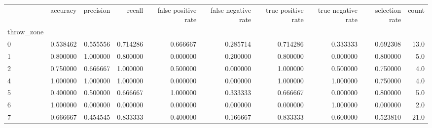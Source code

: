 \begin{tabular}{lrrrrrrrrr}
\toprule
{} &  accuracy &  precision &    recall &  false positive rate &  false negative rate &  true positive rate &  true negative rate &  selection rate &  count \\
throw\_zone &           &            &           &                      &                      &                     &                     &                 &        \\
\midrule
0          &  0.538462 &   0.555556 &  0.714286 &             0.666667 &             0.285714 &            0.714286 &            0.333333 &        0.692308 &   13.0 \\
1          &  0.800000 &   1.000000 &  0.800000 &             0.000000 &             0.200000 &            0.800000 &            0.000000 &        0.800000 &    5.0 \\
2          &  0.750000 &   0.666667 &  1.000000 &             0.500000 &             0.000000 &            1.000000 &            0.500000 &        0.750000 &    4.0 \\
4          &  1.000000 &   1.000000 &  1.000000 &             0.000000 &             0.000000 &            1.000000 &            1.000000 &        0.750000 &    4.0 \\
5          &  0.400000 &   0.500000 &  0.666667 &             1.000000 &             0.333333 &            0.666667 &            0.000000 &        0.800000 &    5.0 \\
6          &  1.000000 &   0.000000 &  0.000000 &             0.000000 &             0.000000 &            0.000000 &            1.000000 &        0.000000 &    2.0 \\
7          &  0.666667 &   0.454545 &  0.833333 &             0.400000 &             0.166667 &            0.833333 &            0.600000 &        0.523810 &   21.0 \\
\bottomrule
\end{tabular}
